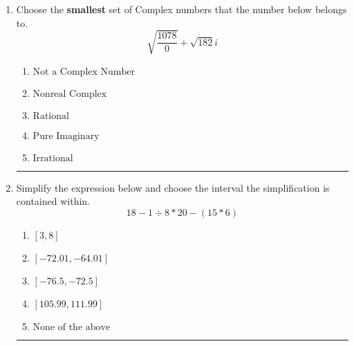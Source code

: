 \documentclass[14pt]{extbook}
\newcommand{\litem}[1]{\item#1\hspace*{-1cm}\rule{\textwidth}{0.4pt}}
\begin{document}
\begin{enumerate}
{\begin{enumerate}[label=\Alph*.]
\end{enumerate} }
\litem{
Choose the \textbf{smallest} set of Complex numbers that the number below belongs to.\[ \sqrt{\frac{1078}{0}}+\sqrt{182} i \]\begin{enumerate}[label=\Alph*.]
\item \( \text{Not a Complex Number} \)
\item \( \text{Nonreal Complex} \)
\item \( \text{Rational} \)
\item \( \text{Pure Imaginary} \)
\item \( \text{Irrational} \)

\end{enumerate} }
\litem{
Simplify the expression below and choose the interval the simplification is contained within.\[ 18 - 1 \div 8 * 20 - (15 * 6) \]\begin{enumerate}[label=\Alph*.]
\item \( [3, 8] \)
\item \( [-72.01, -64.01] \)
\item \( [-76.5, -72.5] \)
\item \( [105.99, 111.99] \)
\item \( \text{None of the above} \)

\end{enumerate} }
\end{enumerate}
\end{document}
